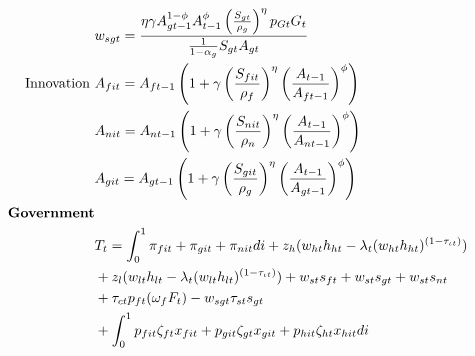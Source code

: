 \begin{align*}
&
w_{sgt}=\frac{\eta \gamma  A_{gt-1}^{1-\phi}A_{t-1}^{\phi}\left(\frac{S_{gt}}{\rho_g}\right)^{\eta}p_{Gt}G_t}{\frac{1}{1-\alpha_g}S_{gt}A_{gt}}\\
\text{Innovation}\ \vspace{4mm}&
A_{fit}=A_{ft-1}\left(1+\gamma\left(\frac{S_{fit}}{\rho_f}\right)^{\eta}\left(\frac{A_{t-1}}{A_{ft-1}}\right)^{\phi}\right) \\
&
A_{nit}=A_{nt-1}\left(1+\gamma\left(\frac{S_{nit}}{\rho_n}\right)^{\eta}\left(\frac{A_{t-1}}{A_{nt-1}}\right)^{\phi}\right) \\
&
A_{git}=A_{gt-1}\left(1+\gamma\left(\frac{S_{git}}{\rho_g}\right)^{\eta}\left(\frac{A_{t-1}}{A_{gt-1}}\right)^{\phi}\right) \\
\text{\textbf{Government}}&\\
&T_t=\int_{0}^{1}\pi_{fit}+\pi_{git}+\pi_{nit}di+z_h(w_{ht}h_{ht}-\lambda_t(w_{ht}h_{ht})^{(1-\tau_{\iota t})})\\&+z_l(w_{lt}h_{lt}-\lambda_t(w_{lt}h_{lt})^{(1-\tau_{\iota t})})+w_{st}s_{ft}+w_{st}s_{gt}+w_{st}s_{nt}\\ &+\tau_{ct}p_{ft}(\omega_fF_t)-w_{sgt}\tau_{st}s_{gt} \\ &+\int_{0}^{1} p_{fit}\zeta_{ft}x_{fit}+p_{git}\zeta_{gt}x_{git}+ p_{hit}\zeta_{ht}x_{hit}di\\

\end{align*}
